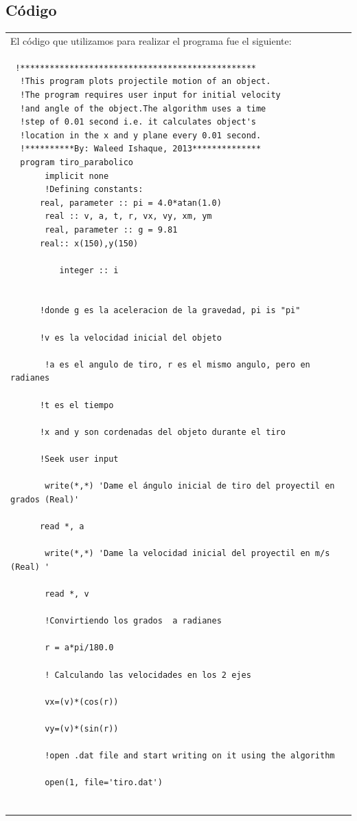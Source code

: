 \documentclass[10pt]{article}
\begin{document}
\subsection{Código}
\begin{tabular}{l}
El código que utilizamos para realizar el programa fue el siguiente:\\

\begin{verbatim}  
 !************************************************  
  !This program plots projectile motion of an object.  
  !The program requires user input for initial velocity   
  !and angle of the object.The algorithm uses a time   
  !step of 0.01 second i.e. it calculates object's  
  !location in the x and y plane every 0.01 second.  
  !**********By: Waleed Ishaque, 2013**************  
  program tiro_parabolico  
       implicit none  
       !Defining constants:  
      real, parameter :: pi = 4.0*atan(1.0) 
       real :: v, a, t, r, vx, vy, xm, ym  
       real, parameter :: g = 9.81  
      real:: x(150),y(150)  

          integer :: i 


      !donde g es la aceleracion de la gravedad, pi is "pi"   

      !v es la velocidad inicial del objeto   

       !a es el angulo de tiro, r es el mismo angulo, pero en radianes   

      !t es el tiempo   

      !x and y son cordenadas del objeto durante el tiro    

      !Seek user input   

       write(*,*) 'Dame el ángulo inicial de tiro del proyectil en grados (Real)'   

      read *, a   

       write(*,*) 'Dame la velocidad inicial del proyectil en m/s (Real) '   

       read *, v   

       !Convirtiendo los grados  a radianes   

       r = a*pi/180.0  

       ! Calculando las velocidades en los 2 ejes

       vx=(v)*(cos(r))

       vy=(v)*(sin(r))

       !open .dat file and start writing on it using the algorithm   

       open(1, file='tiro.dat')   


\end{verbatim}
\end{tabular}
\end{document}
